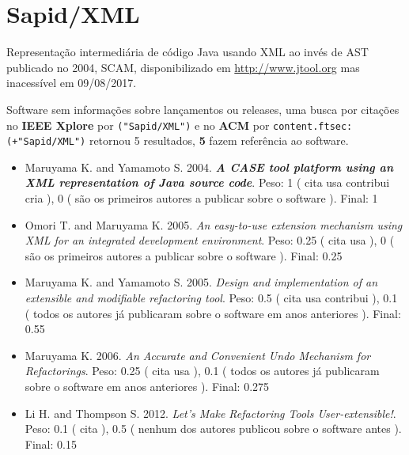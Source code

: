 \section{Sapid/XML}

Representação intermediária de código Java usando XML ao invés de AST
publicado no 2004, SCAM,
disponibilizado em \url{http://www.jtool.org}
mas inacessível em 09/08/2017.

Software sem informações sobre lançamentos ou releases,
uma busca por citações no {\bf IEEE Xplore} por
\texttt{("Sapid/XML")}
e no {\bf ACM} por
\texttt{content.ftsec:(+"Sapid/XML")}
retornou
5 resultados,
{\bf 5} fazem referência ao software.

\begin{itemize}
\item Maruyama K. and Yamamoto S.
      2004.
        \textbf{\textit{ A CASE tool platform using an XML representation of Java source code}}.
      Peso:
      1 (
          cita
          usa
          contribui
          cria
      ),
      0 (
são os primeiros autores a publicar sobre o software
      ).
      Final:
      1

\item Omori T. and Maruyama K.
      2005.
        \textit{ An easy-to-use extension mechanism using XML for an integrated development environment}.
      Peso:
      0.25 (
          cita
          usa
      ),
      0 (
são os primeiros autores a publicar sobre o software
      ).
      Final:
      0.25

\item Maruyama K. and Yamamoto S.
      2005.
        \textit{ Design and implementation of an extensible and modifiable refactoring tool}.
      Peso:
      0.5 (
          cita
          usa
          contribui
      ),
      0.1 (
todos os autores já publicaram sobre o software em anos anteriores
      ).
      Final:
      0.55

\item Maruyama K.
      2006.
        \textit{ An Accurate and Convenient Undo Mechanism for Refactorings}.
      Peso:
      0.25 (
          cita
          usa
      ),
      0.1 (
todos os autores já publicaram sobre o software em anos anteriores
      ).
      Final:
      0.275

\item Li H. and Thompson S.
      2012.
        \textit{ Let's Make Refactoring Tools User-extensible!}.
      Peso:
      0.1 (
          cita
      ),
      0.5 (
nenhum dos autores publicou sobre o software antes
      ).
      Final:
      0.15

\end{itemize}

